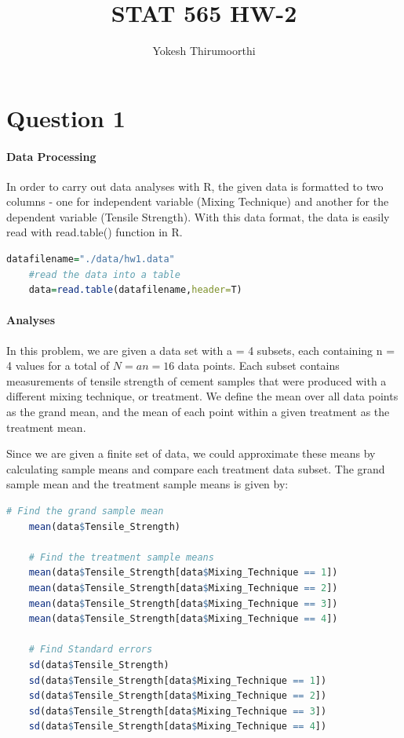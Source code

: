 \documentclass[11pt]{article}
\begin{document}
\title{STAT 565 HW-2}
\author{Yokesh Thirumoorthi}

\maketitle
\pagestyle{fancy}
\fancyhf{}

\section{Question 1}

\paragraph{Data Processing}
In order to carry out data analyses with R, the given data is formatted to two columns - one for independent variable (Mixing Technique) and another for the dependent variable (Tensile Strength). With this data format, the data is easily read with read.table() function in R.

\begin{lstlisting}[language=R]
    datafilename="./data/hw1.data"
    #read the data into a table
    data=read.table(datafilename,header=T)
\end{lstlisting}

\paragraph{Analyses}
In this problem, we are given a data set with a = 4 subsets, each containing n = 4 values for a total of $\displaystyle N=an=16$ data points. 
Each subset contains measurements of tensile strength of cement samples that were produced with a different mixing technique, or treatment. We define the mean over all data points as the grand mean, and the mean of each point within a given treatment as the treatment mean.

Since we are given a finite set of data, we could approximate these means by calculating sample means and compare each treatment data subset. The grand sample mean and the treatment sample means is given by: 

\begin{lstlisting}[language=R]
    # Find the grand sample mean
    mean(data$Tensile_Strength) 

    # Find the treatment sample means
    mean(data$Tensile_Strength[data$Mixing_Technique == 1])
    mean(data$Tensile_Strength[data$Mixing_Technique == 2])
    mean(data$Tensile_Strength[data$Mixing_Technique == 3])
    mean(data$Tensile_Strength[data$Mixing_Technique == 4])
    
    # Find Standard errors
    sd(data$Tensile_Strength)
    sd(data$Tensile_Strength[data$Mixing_Technique == 1])
    sd(data$Tensile_Strength[data$Mixing_Technique == 2])
    sd(data$Tensile_Strength[data$Mixing_Technique == 3])
    sd(data$Tensile_Strength[data$Mixing_Technique == 4])

\end{lstlisting}
\end{document}
